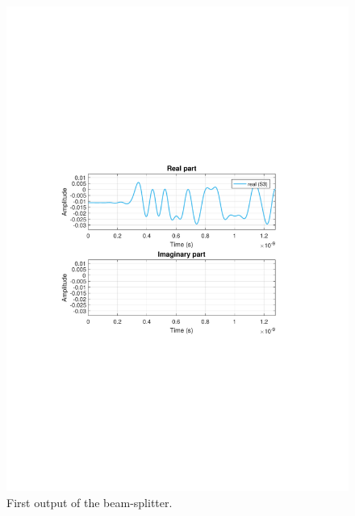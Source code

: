\documentclass{article}
\begin{document}
\begin{figure}[H]
\centering
\includegraphics[width=\linewidth, trim= 0mm 100mm 0mm 100mm, clip]{bs1.pdf}
\caption{First output of the beam-splitter.}
\label{fig:bsout1}
\end{figure}
\end{document}
